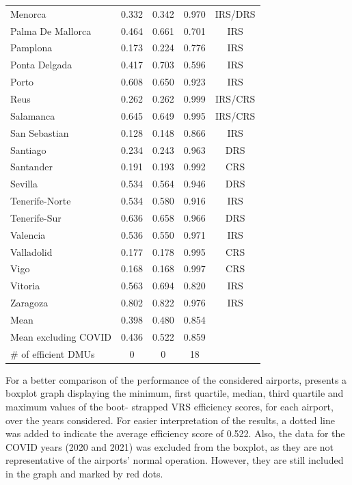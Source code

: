 \begin{table}[h!]
{\begin{tabular}{lcccc}
Menorca & 0.332 & 0.342 & 0.970 & IRS/DRS\\
Palma De Mallorca & 0.464 & 0.661 & 0.701 & IRS\\
Pamplona & 0.173 & 0.224 & 0.776 & IRS\\
Ponta Delgada & 0.417 & 0.703 & 0.596 & IRS\\
Porto & 0.608 & 0.650 & 0.923 & IRS\\
Reus & 0.262 & 0.262 & 0.999 & IRS/CRS\\
Salamanca & 0.645 & 0.649 & 0.995 & IRS/CRS\\
San Sebastian & 0.128 & 0.148 & 0.866 & IRS\\
Santiago & 0.234 & 0.243 & 0.963 & DRS\\
Santander & 0.191 & 0.193 & 0.992 & CRS\\
Sevilla & 0.534 & 0.564 & 0.946 & DRS\\
Tenerife-Norte & 0.534 & 0.580 & 0.916 & IRS\\
Tenerife-Sur & 0.636 & 0.658 & 0.966 & DRS\\
Valencia & 0.536 & 0.550 & 0.971 & IRS\\
Valladolid & 0.177 & 0.178 & 0.995 & CRS\\
Vigo & 0.168 & 0.168 & 0.997 & CRS\\
Vitoria & 0.563 & 0.694 & 0.820 & IRS\\
Zaragoza & 0.802 & 0.822 & 0.976 & IRS\\
\midrule
Mean & 0.398 & 0.480 & 0.854 & \\
Mean excluding COVID & 0.436 & 0.522 & 0.859 & \\
\# of efficient DMUs & 0 & 0 & 18 & \\
\bottomrule
\end{tabular}%
}
\end{table}

\vspace{-0.2cm}



For a better comparison of the performance of the considered airports,  presents a boxplot  
graph displaying the minimum, first quartile, median, third quartile and maximum values of the boot-
strapped VRS efficiency scores, for each airport, over the years considered. For easier interpretation of
the results, a dotted line was added to indicate the average efficiency score of 0.522. Also, the data for
the COVID years (2020 and 2021) was excluded from the boxplot, as they are not representative of the
airports’ normal operation. However, they are still included in the graph and marked by red dots.

